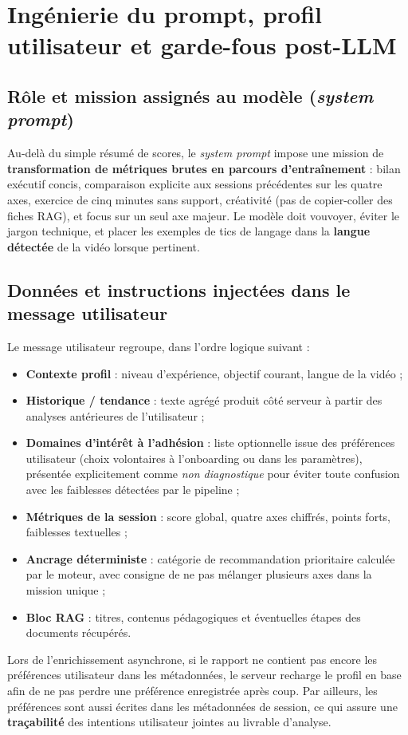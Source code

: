 ﻿\documentclass[12pt,a4paper]{article}
\begin{document}
\section{Ingénierie du prompt, profil utilisateur et garde-fous post-LLM}
\label{sec:prompt-guardrails}

\subsection{Rôle et mission assignés au modèle (\textit{system prompt})}
Au-delà du simple résumé de scores, le \textit{system prompt} impose une mission de \textbf{transformation de métriques brutes en parcours d'entraînement} : bilan exécutif concis, comparaison explicite aux sessions précédentes sur les quatre axes, exercice de cinq minutes sans support, créativité (pas de copier-coller des fiches RAG), et focus sur un seul axe majeur. Le modèle doit vouvoyer, éviter le jargon technique, et placer les exemples de tics de langage dans la \textbf{langue détectée} de la vidéo lorsque pertinent.

\subsection{Données et instructions injectées dans le message utilisateur}
Le message utilisateur regroupe, dans l'ordre logique suivant :
\begin{itemize}
    \item \textbf{Contexte profil} : niveau d'expérience, objectif courant, langue de la vidéo ;
    \item \textbf{Historique / tendance} : texte agrégé produit côté serveur à partir des analyses antérieures de l'utilisateur ;
    \item \textbf{Domaines d'intérêt à l'adhésion} : liste optionnelle issue des préférences utilisateur (choix volontaires à l'onboarding ou dans les paramètres), présentée explicitement comme \textit{non diagnostique} pour éviter toute confusion avec les faiblesses détectées par le pipeline ;
    \item \textbf{Métriques de la session} : score global, quatre axes chiffrés, points forts, faiblesses textuelles ;
    \item \textbf{Ancrage déterministe} : catégorie de recommandation prioritaire calculée par le moteur, avec consigne de ne pas mélanger plusieurs axes dans la mission unique ;
    \item \textbf{Bloc RAG} : titres, contenus pédagogiques et éventuelles étapes des documents récupérés.
\end{itemize}
Lors de l'enrichissement asynchrone, si le rapport ne contient pas encore les préférences utilisateur dans les métadonnées, le serveur recharge le profil en base afin de ne pas perdre une préférence enregistrée après coup. Par ailleurs, les préférences sont aussi écrites dans les métadonnées de session, ce qui assure une \textbf{traçabilité} des intentions utilisateur jointes au livrable d'analyse.
\end{document}
